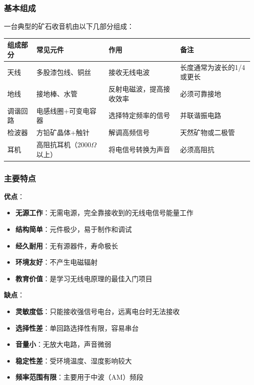 \subsubsection{基本组成}
\label{sec:crystal_radio_components}

一台典型的矿石收音机由以下几部分组成：

\begin{center}
\begin{tabular}{|p{2.5cm}|p{3cm}|p{5cm}|p{4cm}|}
\hline
\textbf{组成部分} & \textbf{常见元件} & \textbf{作用} & \textbf{备注} \\
\hline
天线 & 多股漆包线、铜丝 & 接收无线电波 & 长度通常为波长的1/4或更长 \\
地线 & 接地棒、水管 & 反射电磁波，提高接收效率 & 必须可靠接地 \\
调谐回路 & 电感线圈+可变电容器 & 选择特定频率的信号 & 并联谐振电路 \\
检波器 & 方铅矿晶体+触针 & 解调高频信号 & 天然矿物或二极管 \\
耳机 & 高阻抗耳机（2000$\Omega$以上） & 将电信号转换为声音 & 必须高阻抗 \\
\hline
\end{tabular}
\end{center}

\subsubsection{主要特点}
\label{sec:crystal_radio_features}

\textbf{优点}：
\begin{itemize}
    \item \textbf{无源工作}：无需电源，完全靠接收到的无线电信号能量工作
    \item \textbf{结构简单}：元件极少，易于制作和调试
    \item \textbf{经久耐用}：无有源器件，寿命极长
    \item \textbf{环境友好}：不产生电磁辐射
    \item \textbf{教育价值}：是学习无线电原理的最佳入门项目
\end{itemize}

\textbf{缺点}：
\begin{itemize}
    \item \textbf{灵敏度低}：只能接收强信号电台，远离电台时无法接收
    \item \textbf{选择性差}：单回路选择性有限，容易串台
    \item \textbf{音量小}：无放大电路，声音微弱
    \item \textbf{稳定性差}：受环境温度、湿度影响较大
    \item \textbf{频率范围有限}：主要用于中波（AM）频段
\end{itemize}

